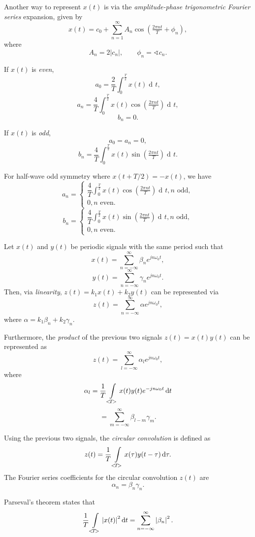 \documentclass[10pt,letterpaper]{article}
\DeclareMathOperator{\di}{d\!} %
\newcommand{\sumi}[1][1]{ \sum_{n={#1}}^{\infty} } %
\newcommand{\bracks}[1]{ \left( #1 \right) } %
\newcommand{\tpfrac}[2]{\left(\tfrac{#1}{#2}\right)} %
\newcommand{\abs}[1]{\left| #1 \right|} %
\newcommand{\xabs}{ \abs{x(t)}^2 }
\newcommand{\Uint}{ \int\displaylimits_{<\!T\!>} }
\newcommand{\fatcos}{ \cos\tpfrac{2\pi nt}{T} }
\newcommand{\fatsin}{ \sin\tpfrac{2\pi nt}{T} }
\newcommand{\Hint}{ \int_0^{\frac{T}{2}} }
\newcommand{\omegaE}{ e^{jn\omega_0t} }
\newcommand{\omegaEneg}{ e^{-jn\omega_0t} }
\begin{document}
\begin{multicols*}{3}
Another way to represent $x(t)$ is via the \textit{amplitude-phase trigonometric Fourier series} expansion, given by
\[ x(t) = c_0 + \sumi A_n \cos\bracks{\tfrac{2\pi nt}{T} + \phi_n}, \]
where
\[ A_n = 2|c_n|, \qquad \phi_n = \sphericalangle c_n. \]

If $x(t)$ is \textit{even},
\[ a_0 = \dfrac{2}{T} \Hint x(t) \di t, \]
\[ a_n = \dfrac{4}{T} \Hint x(t) \fatcos \di t, \]
\[ b_n = 0. \]

If $x(t)$ is \textit{odd},
\[ a_0 = a_n = 0, \]
\[ b_n = \dfrac{4}{T} \Hint x(t) \fatsin \di t. \]

For half-wave odd symmetry where $x(t + T/2) = -x(t)$, we have
\[ a_n = \begin{cases}
		\dfrac{4}{T} \displaystyle\Hint x(t) \fatcos \di t, n \text{ odd}, \\
		0, n \text{ even}.
		\end{cases} 
\]
\[ b_n = \begin{cases}
		\dfrac{4}{T} \displaystyle\Hint x(t) \fatsin \di t, n \text{ odd}, \\
		0, n \text{ even}.
		\end{cases} 
\]

Let $x(t)$ and $y(t)$ be periodic signals with the same period such that
\[ x(t) = \sumi[-\infty] \beta_n \omegaE, \]
\[ y(t) = \sumi[-\infty] \gamma_n \omegaE. \]
Then, via \textit{linearity}, $z(t) = k_1x(t) + k_2y(t)$ can be represented via
\[ z(t) = \sumi[-\infty] \alpha \omegaE, \]
where $\alpha = k_1\beta_n + k_2\gamma_n$. 

Furthermore, the \textit{product} of the previous two signals $z(t) = x(t)y(t)$ can be represented as
\[ z(t) = \sum_{l = -\infty}^{\infty} \alpha_l \omegaE, \]
where
\[ \alpha_l = \dfrac{1}{T} \Uint x(t)y(t) \omegaEneg \di t \]
\[ = \sum^{\infty}_{m = -\infty}\beta_{l-m}\gamma_m. \]

Using the previous two signals, the \textit{circular convolution} is defined as
\[ z(t) = \dfrac{1}{T} \Uint x(\tau) y(t-\tau) \di \tau. \]
The Fourier series coefficients for the circular convolution $z(t)$ are
\[ \alpha_n = \beta_n\gamma_n. \]


Parseval's theorem states that
\[ \dfrac{1}{T} \Uint \xabs \di t = \sumi[-\infty] \abs{\beta_n}^2. \]


\end{multicols*}
\end{document}

